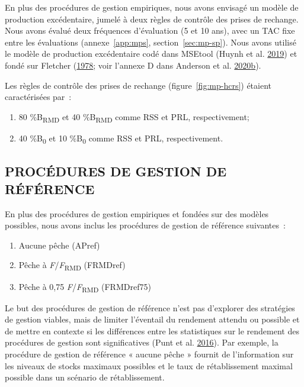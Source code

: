 \documentclass[11pt]{book}
\begin{document}
En plus des procédures de gestion empiriques, nous avons envisagé un modèle de production excédentaire, jumelé à deux règles de contrôle des prises de rechange. Nous avons évalué deux fréquences d'évaluation (5 et 10 ans), avec un TAC fixe entre les évaluations (annexe~\ref{app:mps}, section~\ref{sec:mp-sp}). Nous avons utilisé le modèle de production excédentaire codé dans MSEtool (Huynh et al. \protect\hyperlink{ref-huynh_msetool_2019}{2019}) et fondé sur Fletcher (\protect\hyperlink{ref-fletcher1978}{1978}; voir l'annexe D dans Anderson et al. \protect\hyperlink{ref-anderson2020gfmp}{2020}\protect\hyperlink{ref-anderson2020gfmp}{b}).

Les règles de contrôle des prises de rechange (figure~\ref{fig:mp-hcrs}) étaient caractérisées par~:
\begin{enumerate}
\def\labelenumi{\arabic{enumi}.}

\item
  80 \%B\textsubscript{RMD} et 40 \%B\textsubscript{RMD} comme RSS et PRL, respectivement;
\item
  40 \%B\textsubscript{0} et 10 \%B\textsubscript{0} comme RSS et PRL, respectivement.
\end{enumerate}
\hypertarget{procuxe9dures-de-gestion-de-ruxe9fuxe9rence}{%
\subsection{PROCÉDURES DE GESTION DE RÉFÉRENCE}\label{procuxe9dures-de-gestion-de-ruxe9fuxe9rence}}

En plus des procédures de gestion empiriques et fondées sur des modèles possibles, nous avons inclus les procédures de gestion de référence suivantes~:
\begin{enumerate}
\def\labelenumi{\arabic{enumi}.}

\item
  Aucune pêche (APref)
\item
  Pêche à \emph{F}/\emph{F}\textsubscript{RMD} (FRMDref)
\item
  Pêche à 0,75 \emph{F}/\emph{F}\textsubscript{RMD} (FRMDref75)
\end{enumerate}
Le but des procédures de gestion de référence n'est pas d'explorer des stratégies de gestion viables, mais de limiter l'éventail du rendement attendu ou possible et de mettre en contexte si les différences entre les statistiques sur le rendement des procédures de gestion sont significatives (Punt et al. \protect\hyperlink{ref-punt2016}{2016}). Par exemple, la procédure de gestion de référence « aucune pêche » fournit de l'information sur les niveaux de stocks maximaux possibles et le taux de rétablissement maximal possible dans un scénario de rétablissement.
\end{document}
